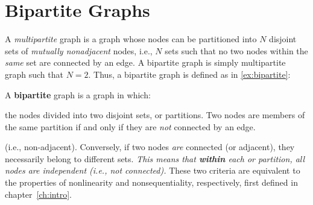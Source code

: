 \section{Bipartite Graphs}\label{sec:bipartite}
A \emph{multipartite} graph is a graph 
whose nodes can be partitioned into $N$ disjoint sets of 
\emph{mutually nonadjacent} nodes, i.e., $N$ sets such that no two
nodes within the \emph{same} set are connected by an edge. A bipartite graph
is simply multipartite graph such that $N = 2$. Thus, a bipartite graph is defined 
as in \ref{ex:bipartite}: 
\begin{exe} \label{ex:bipartite} \ex A \textbf{bipartite} graph is a graph in which:\begin{xlist} 
	\ex %
	the nodes divided into two disjoint sets, or partitions. \label{ex:bipartite1} %
	\ex %
	Two nodes are members of the same partition if and only if 
	they are \emph{not} connected by an edge.
	\label{ex:bipartite2}
	\end{xlist}
\end{exe}
(i.e., non-adjacent). Conversely, 
	if two nodes \emph{are} connected (or adjacent), they necessarily belong to different sets. 
	\emph{This means that \textbf{within} each or partition, all nodes are independent 
	(i.e., not connected).}
These two criteria are equivalent to the properties of nonlinearity and 
nonsequentiality, respectively, first defined in chapter~\ref{ch:intro}.

